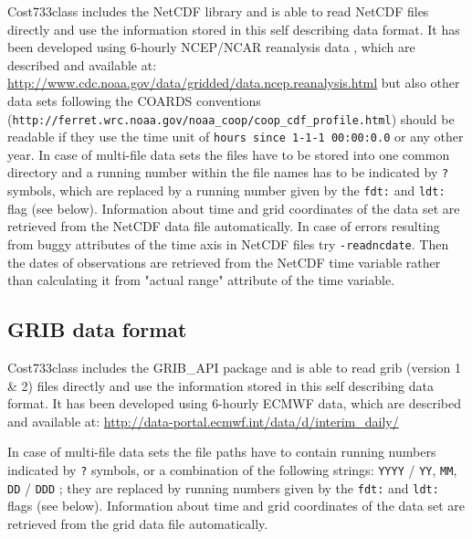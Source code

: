 \documentclass[12pt, oneside, a4paper, headsepline, plainheadsepline]{scrbook}
\begin{document}
Cost733class includes the NetCDF library and is able to read 
NetCDF files directly and use the information stored in this self describing
data format. It has been developed using 6-hourly NCEP/NCAR reanalysis 
data \citep{Kalnay1996}, which are described and available at:
\url{http://www.cdc.noaa.gov/data/gridded/data.ncep.reanalysis.html} but also other
data sets following the COARDS conventions \\
(\verb+http://ferret.wrc.noaa.gov/noaa_coop/coop_cdf_profile.html+)
should be readable if they use the time unit of \verb+hours since 1-1-1 00:00:0.0+ or any other year.
In case of multi-file data sets the files have to be stored into one common directory and a running number
within the file names has to be indicated by \verb+?+ symbols, which are replaced by a running number given 
by the \verb+fdt:+ and \verb+ldt:+ flag (see below). 
Information about time and grid coordinates of the data set are retrieved from the 
NetCDF data file automatically. In case of errors resulting from buggy attributes of the time axis in NetCDF files try \verb+-readncdate+. Then the dates of observations are retrieved from the NetCDF time variable rather than calculating it from "actual range" attribute of the time variable.

\subsection{GRIB data format}

Cost733class includes the GRIB\_API package and is able to read 
grib (version 1 \& 2) files directly and use the information stored in this self describing
data format. It has been developed using 6-hourly ECMWF 
data, which are described and available at:
\url{http://data-portal.ecmwf.int/data/d/interim_daily/} %

In case of multi-file data sets the file paths have to contain running numbers
indicated by \verb+?+ symbols, or a combination of the following strings:
\verb+YYYY+ / \verb+YY+, \verb+MM+, \verb+DD+ / \verb+DDD+
; they are replaced by running numbers given 
by the \verb+fdt:+ and \verb+ldt:+ flags (see below). 
Information about time and grid coordinates of the data set are retrieved from the 
grid data file automatically.
\end{document}
